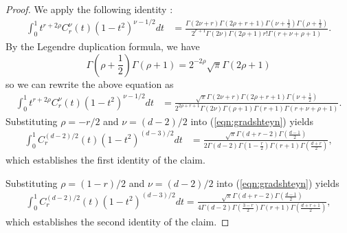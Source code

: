 \documentclass{article}
\theoremstyle{definition}
\begin{document}
\begin{proof}
    We apply the following identity \citep[see][Equation 7.311.2]{gradshteyn2014table}:
    \begin{align*}
        \int_0^1 t^{r + 2\rho}C_r^{\nu}(t)(1 - t^2)^{\nu - 1/2}dt &= \frac{\Gamma(2 \nu+r) \Gamma(2 \rho+r+1) \Gamma\left(\nu+\frac{1}{2}\right) \Gamma\left(\rho+\frac{1}{2}\right)}{2^{r+1} \Gamma(2 \nu) \Gamma(2 \rho+1) r ! \Gamma(r+\nu+\rho+1)}.
    \end{align*}
    By the Legendre duplication formula, we have 
    \[\Gamma\left(\rho + \frac{1}{2}\right)\Gamma(\rho + 1) = 2^{-2\rho}\sqrt{\pi}\Gamma(2\rho +1) \]
    so we can rewrite the above equation as
    \begin{align}
        \int_0^1 t^{r + 2\rho}C_r^{\nu}(t)(1 - t^2)^{\nu - 1/2}dt &= \frac{\sqrt{\pi} \Gamma(2 \nu + r)\Gamma(2\rho + r + 1)\Gamma\left(\nu + \frac{1}{2}\right) }{2^{2\rho + r + 1}\Gamma(2\nu)\Gamma(\rho + 1) \Gamma(r + 1)\Gamma(r + \nu + \rho + 1) }. \label{eqn:gradshteyn}
    \end{align}
    Substituting $\rho = -r/2$ and $\nu = (d - 2)/2$ into (\ref{eqn:gradshteyn}) yields 
    \begin{align*}
        \int_0^1 C_r^{(d - 2)/2}(t)(1 - t^2)^{(d - 3)/2}dt &= \frac{\sqrt{\pi}\Gamma(d + r - 2)\Gamma\left(\frac{d - 1}{2}\right) }{2\Gamma(d - 2)\Gamma\left(1 - \frac{r}{2}\right)\Gamma(r + 1)\Gamma\left(\frac{d + r}{2}\right) } , 
    \end{align*}
    which establishes the first identity of the claim.

    Substituting $\rho = (1 - r)/2$ and $\nu = (d - 2)/2$ into (\ref{eqn:gradshteyn}) yields
    \begin{align*}
        \int_0^1 C_r^{(d - 2)/2}(t) (1 - t^2)^{(d - 3)/2}dt = \frac{\sqrt{\pi}\Gamma(d + r - 2)\Gamma\left(\frac{d - 1}{2}\right) }{4\Gamma(d - 2)\Gamma\left(\frac{3 - r}{2}\right)\Gamma(r + 1)\Gamma\left(\frac{d + r + 1}{2}\right) } , 
    \end{align*}
    which establishes the second identity of the claim. 
\end{proof}
\end{document}
